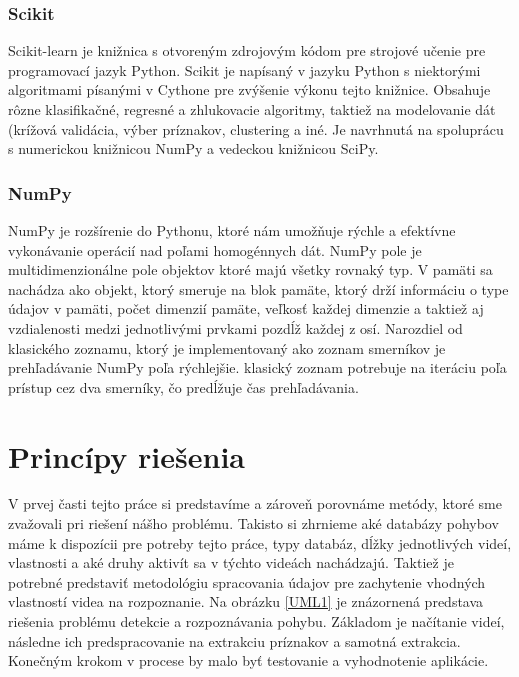 \subsubsection{Scikit}
Scikit-learn je knižnica s otvoreným zdrojovým kódom pre strojové učenie pre programovací jazyk Python. Scikit je napísaný v jazyku Python s niektorými algoritmami písanými v Cythone pre zvýšenie výkonu tejto knižnice. Obsahuje rôzne klasifikačné, regresné a zhlukovacie algoritmy, taktiež na modelovanie dát (krížová validácia, výber príznakov, clustering a iné. Je navrhnutá na spoluprácu s numerickou knižnicou NumPy a vedeckou knižnicou SciPy. \cite{c5}

\subsubsection{NumPy}
NumPy je rozšírenie do Pythonu, ktoré nám umožňuje rýchle a efektívne vykonávanie operácií nad poľami homogénnych dát. NumPy pole je multidimenzionálne pole objektov ktoré majú všetky rovnaký typ. V pamäti sa nachádza ako objekt, ktorý smeruje na blok pamäte, ktorý drží informáciu o type údajov v pamäti, počet dimenzií pamäte, veľkosť každej dimenzie a taktiež aj vzdialenosti medzi jednotlivými prvkami pozdĺž každej z osí. Narozdiel od klasického zoznamu, ktorý je implementovaný ako zoznam smerníkov je prehľadávanie NumPy poľa rýchlejšie. klasický zoznam potrebuje na iteráciu poľa prístup cez dva smerníky, čo predĺžuje čas prehľadávania.\cite{c8}


\section{Princípy riešenia}
V prvej časti tejto práce si predstavíme a zároveň porovnáme metódy, ktoré sme zvažovali pri riešení nášho problému. Takisto si zhrnieme aké databázy pohybov máme k dispozícii pre potreby tejto práce, typy databáz, dĺžky jednotlivých videí, vlastnosti a aké druhy aktivít sa v týchto videách nachádzajú. Taktiež je potrebné predstaviť metodológiu spracovania údajov pre zachytenie vhodných vlastností videa na rozpoznanie. Na obrázku \ref{UML1} je znázornená predstava riešenia problému detekcie a rozpoznávania pohybu. Základom je načítanie videí, následne ich predspracovanie na extrakciu príznakov a samotná extrakcia. Konečným krokom v procese by malo byť testovanie a vyhodnotenie aplikácie. 


